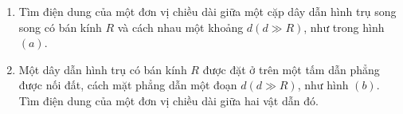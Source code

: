     \begin{vd}
\begin{enumerate}[1)]
    \item Tìm điện dung của một đơn vị chiều dài giữa một cặp dây dẫn hình trụ song song có bán kính $R$ và cách nhau một khoảng $d(d\gg R)$, như trong hình $(a)$.
    \item Một dây dẫn hình trụ có bán kính $R$ được đặt ở trên một tấm dẫn phẳng được nối đất, cách mặt phẳng dẫn một đoạn $d(d\gg R)$, như hình $(b)$. Tìm điện dung của một đơn vị chiều dài giữa hai vật dẫn đó.
\end{enumerate}
\begin{center}



\begin{tikzpicture}[x=0.75pt,y=0.75pt,yscale=-1,xscale=1]


\end{tikzpicture}
\end{center}
\end{vd}
